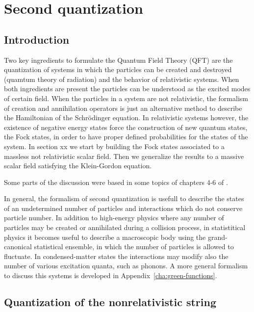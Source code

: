 \chapter{Second quantization}
\label{cha:second-quantization} %

\section{Introduction}
Two key ingredients to formulate the Quantum Field Theory (QFT) are the quantization of systems in which the particles can be created and destroyed (quamtum theory of radiation) and the behavior of relativistic systems. When both ingredients are present the particles can be understood as the excited modes of certain field. When the particles in a system are not relativistic, the formalism of creation and annihilation operators is just an alternative method to describe the Hamiltonian of the Schr\"odinger equation. In relativistic systems however, the existence of negative energy states force the construction of new quantum states, the Fock states, in order to have proper defined probabilities for the states of the system. In section xx we start by building the Fock states associated to a massless not relativistic scalar field. Then we generalize the results to a massive scalar field satisfying the Klein-Gordon equation.

Some parts of the discussion were based in some topics of chapters 4-6 of \cite{Maggiore:2005qv}.


In general, the formalism of second quantization is usefull to describe the states of an undetermined number of particles and interactions which do not conserve particle number. In addition to high-energy physics where any number of particles may be created or annihilated during a collision process, in statistitical physics it becomes useful to describe a macroscopic body using the grand-canonical statistical ensemble, in which the number of particles is allowed to fluctuate. In condensed-matter states the interactions may modify also the number of various excitation quanta, such as phonons. A more general formalism to discuss this systems is developed in Appendix~\ref{cha:green-functions}.

\section{Quantization of the nonrelativistic string}
\label{sec:fock-space-real}

